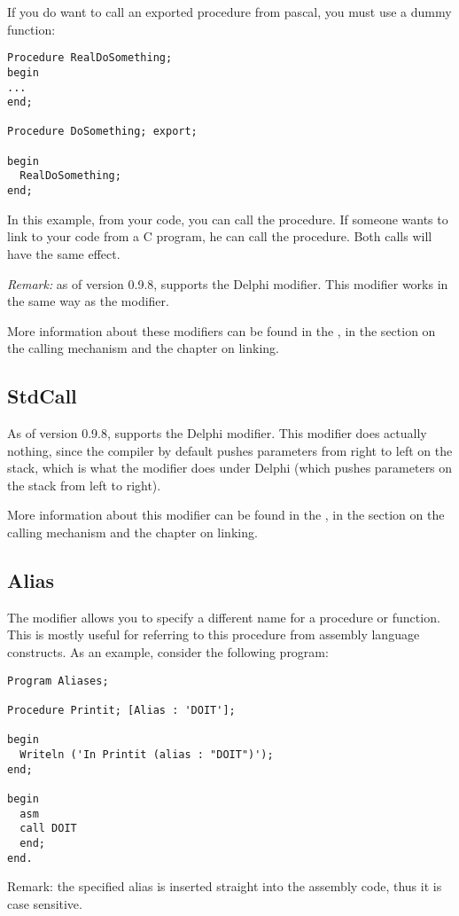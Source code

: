 \documentclass{report}
\begin{document}
If you do want to call an exported procedure from pascal, you must use a
dummy function:
\begin{verbatim}
Procedure RealDoSomething;
begin
...
end;

Procedure DoSomething; export;

begin
  RealDoSomething;
end; 
\end{verbatim}
In this example, from your \fpc code, you can call the 
procedure. If someone wants to link to your code from a C program, he can
call the  procedure. Both calls will have the same effect.

{\em Remark:}
as of version 0.9.8, \fpc supports the Delphi  modifier. 
This modifier works in the same way as the  modifier.

More information about these modifiers can be found in the \progref, in the
section on the calling mechanism and the chapter on linking.

\subsection{StdCall}
As of version 0.9.8, \fpc supports the Delphi  modifier.
This modifier does actually nothing, since the \fpc compiler by default 
pushes parameters from right to left on the stack, which is what the 
modifier does under Delphi (which pushes parameters on the stack from left to 
right).

More information about this modifier can be found in the \progref, in the
section on the calling mechanism and the chapter on linking.

\subsection{Alias}
The  modifier allows you to specify a different name for a
procedure or function. This is mostly useful for referring to this procedure
from assembly language constructs. As an example, consider the following
program:

\begin{CodEx}
\begin{verbatim}
Program Aliases;

Procedure Printit; [Alias : 'DOIT'];

begin
  Writeln ('In Printit (alias : "DOIT")');
end;

begin
  asm
  call DOIT
  end;
end.
\end{verbatim}
\end{CodEx}
{\rm Remark:} the specified alias is inserted straight into the assembly
code, thus it is case sensitive.
\end{document}
